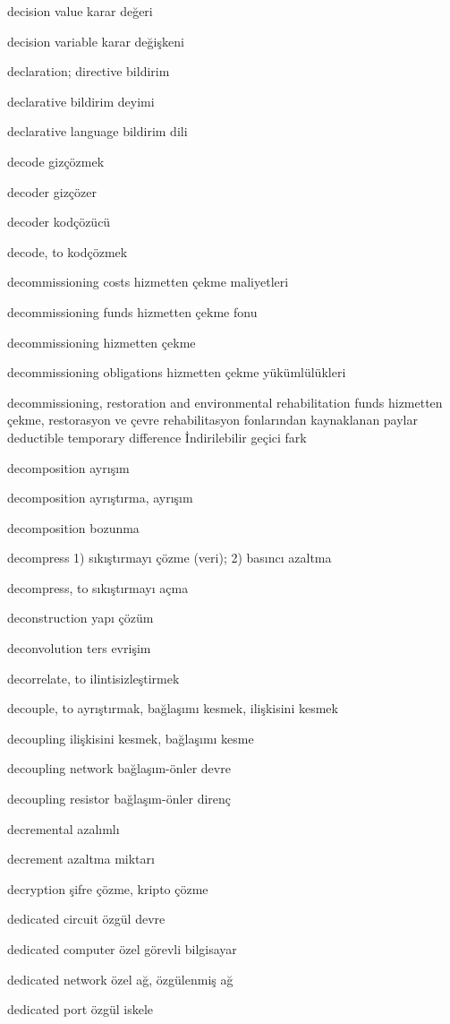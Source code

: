 \documentclass[12pt,fleqn]{article}\usepackage{../../common}
\begin{document}
decision value karar değeri

decision variable karar değişkeni

declaration; directive bildirim

declarative bildirim deyimi

declarative language bildirim dili

decode gizçözmek

decoder gizçözer

decoder kodçözücü

decode, to kodçözmek

decommissioning costs hizmetten çekme maliyetleri

decommissioning funds hizmetten çekme fonu

decommissioning hizmetten çekme

decommissioning obligations hizmetten çekme yükümlülükleri

decommissioning, restoration and environmental rehabilitation funds hizmetten çekme, restorasyon ve çevre rehabilitasyon fonlarından kaynaklanan paylar deductible temporary difference İndirilebilir geçici fark

decomposition ayrışım

decomposition ayrıştırma, ayrışım

decomposition bozunma

decompress 1) sıkıştırmayı çözme (veri); 2) basıncı azaltma

decompress, to sıkıştırmayı açma

deconstruction yapı çözüm

deconvolution ters evrişim

decorrelate, to ilintisizleştirmek

decouple, to ayrıştırmak, bağlaşımı kesmek, ilişkisini kesmek

decoupling ilişkisini kesmek, bağlaşımı kesme

decoupling network bağlaşım-önler devre

decoupling resistor bağlaşım-önler direnç

decremental azalımlı

decrement azaltma miktarı

decryption şifre çözme, kripto çözme

dedicated circuit özgül devre

dedicated computer özel görevli bilgisayar

dedicated network özel ağ, özgülenmiş ağ

dedicated port özgül iskele
\end{document}
